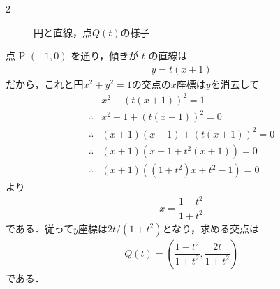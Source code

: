 \documentclass[../../main.tex]{subfiles}
\begin{document}
\begin{multicols}{2}
\begin{figure}[H]
    \caption{円と直線，点$Q(t)$の様子}
    \label{1999-2:fig:1}
  \end{figure}

  点 P $(−1, 0)$ を通り，傾きが $t$ の直線は
  \begin{align}
    y = t(x+1)
  \end{align}
  だから，これと円$x^2+y^2=1$の交点の$x$座標は$y$を消去して
  \begin{align}
    & x^2 + \left(t(x+1)\right)^2 = 1         \\
    \therefore
    & x^2-1 +  \left(t(x+1)\right)^2 = 0      \\
    \therefore
    & (x+1)(x-1) +  \left(t(x+1)\right)^2 = 0 \\
    \therefore
    & (x+1)\left(x-1 + t^2(x+1)\right) = 0    \\
    \therefore
    & (x+1)\left((1+t^2)x+t^2-1\right) = 0
  \end{align}
  より
  \begin{align}
    x = \dfrac{1-t^2}{1+t^2}
  \end{align}
  である．従って$y$座標は$2t/(1+t^2)$となり，求める交点は
  \begin{align}
    Q(t) = \left(\dfrac{1-t^2}{1+t^2}, \dfrac{2t}{1+t^2}\right) \label{eq:1}
  \end{align}
  である．


\end{multicols}
\end{document}
